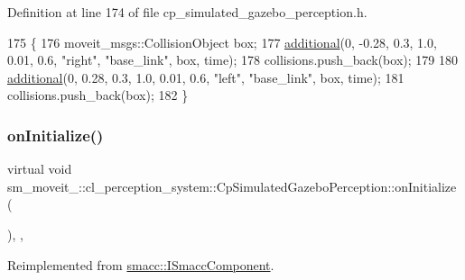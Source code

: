 Definition at line 174 of file cp\+\_\+simulated\+\_\+gazebo\+\_\+perception.\+h.


\begin{DoxyCode}
175             \{
176                 moveit\_msgs::CollisionObject box;
177                 \hyperlink{classsm__moveit__4_1_1cl__perception__system_1_1CpSimulatedGazeboPerception_a23c97387cc84b87183a39489438aeaf0}{additional}(0, -0.28, 0.3, 1.0, 0.01, 0.6, \textcolor{stringliteral}{"right"}, \textcolor{stringliteral}{"base\_link"}, box, time);
178                 collisions.push\_back(box);
179 
180                 \hyperlink{classsm__moveit__4_1_1cl__perception__system_1_1CpSimulatedGazeboPerception_a23c97387cc84b87183a39489438aeaf0}{additional}(0, 0.28, 0.3, 1.0, 0.01, 0.6, \textcolor{stringliteral}{"left"}, \textcolor{stringliteral}{"base\_link"}, box, time);
181                 collisions.push\_back(box);
182             \}
\end{DoxyCode}
\mbox{\label{classsm__moveit__4_1_1cl__perception__system_1_1CpSimulatedGazeboPerception_adebc30f6b1fc905f783de3f7bdf4a711}} 
\subsubsection{\texorpdfstring{on\+Initialize()}{onInitialize()}}
{\footnotesize\ttfamily virtual void sm\+\_\+moveit\+\_\+::cl\+\_\+perception\+\_\+system\+::\+Cp\+Simulated\+Gazebo\+Perception\+::on\+Initialize (\begin{DoxyParamCaption}{ }\end{DoxyParamCaption})\hspace{0.3cm}{\ttfamily [inline]}, {\ttfamily [override]}, {\ttfamily [virtual]}}



Reimplemented from \hyperlink{classsmacc_1_1ISmaccComponent_ae6f71d008db12553912e9436184b9e65}{smacc\+::\+I\+Smacc\+Component}.



